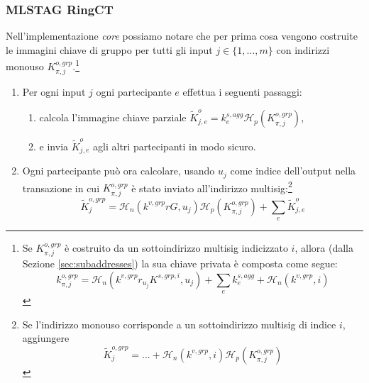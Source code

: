 \subsubsection*{MLSTAG RingCT}

Nell'implementazione \emph{core} possiamo notare che per prima cosa vengono costruite le immagini chiave di gruppo per tutti gli input $j \in \{1,...,m\}$ con indirizzi monouso $K^{o,grp}_{\pi,j}$.\footnote{Se $K^{o,grp}_{\pi,j}$ è costruito da un sottoindirizzo multisig indicizzato $i$, allora (dalla Sezione \ref{sec:subaddresses}) la sua chiave privata è composta come segue:
\[k^{o,grp}_{\pi,j} = \mathcal{H}_n(k^{v,grp} r_{u_j} K^{s,grp,i}, u_j) + \sum_e k^{s,agg}_e + \mathcal{H}_n(k^{v,grp},i)\]}
\begin{enumerate}
    \item Per ogni input $j$ ogni partecipante $e$ effettua i seguenti passaggi:
    \begin{enumerate}
        \item calcola l'immagine chiave parziale $\tilde{K}^{o}_{j,e} = k^{s,agg}_e \mathcal{H}_p(K^{o,grp}_{\pi,j})$,
        \item e invia $\tilde{K}^{o}_{j,e}$ agli altri partecipanti in modo sicuro.
    \end{enumerate}
    \item Ogni partecipante può ora calcolare, usando $u_j$ come indice dell'output nella transazione in cui $K^{o,grp}_{\pi,j}$ è stato inviato all'indirizzo multisig:\footnote{Se l'indirizzo monouso corrisponde a un sottoindirizzo multisig di indice $i$, aggiungere
    \[\tilde{K}^{o,grp}_j = ... + \mathcal{H}_n(k^{v,grp},i) \mathcal{H}_p(K^{o,grp}_{\pi,j})\]}
    \[\tilde{K}^{o,grp}_j = \mathcal{H}_n(k^{v,grp} r G, u_j) \mathcal{H}_p(K^{o,grp}_{\pi,j}) + \sum_e \tilde{K}^{o}_{j,e}\]
\end{enumerate}

